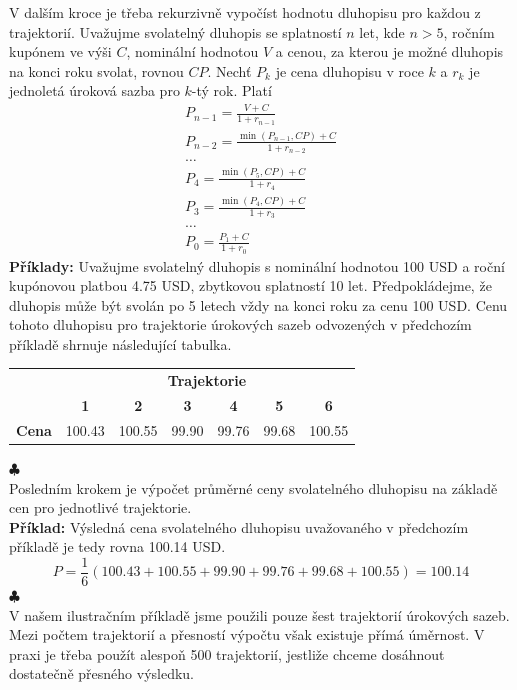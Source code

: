 \documentclass[a4paper]{book}
\begin{document}
V dalším kroce je třeba rekurzivně vypočíst hodnotu dluhopisu pro každou z trajektorií. Uvažujme svolatelný dluhopis se splatností $n$ let, kde $n > 5$, ročním kupónem ve výši $C$, nominální hodnotou $V$ a cenou, za kterou je možné dluhopis na konci roku svolat, rovnou $CP$. Nechť $P_k$ je cena dluhopisu v roce $k$ a $r_k$ je jednoletá úroková sazba pro $k$-tý rok. Platí
\begin{gather*}
P_{n-1} = \frac{V + C}{1 + r_{n-1}} \\
P_{n-2} = \frac{\min(P_{n-1},CP) + C}{1 + r_{n-2}} \\
\dots \\
P_4 = \frac{\min(P_5,CP) + C}{1 + r_4} \\
P_3 = \frac{\min(P_4,CP) + C}{1 + r_3} \\
\dots \\
P_0 = \frac{P_1 + C}{1 + r_0}
\end{gather*}
\noindent \textbf{Příklady:} Uvažujme svolatelný dluhopis s nominální hodnotou 100 USD a roční kupónovou platbou 4.75 USD, zbytkovou splatností 10 let. Předpokládejme, že dluhopis může být svolán po 5 letech vždy na konci roku za cenu 100 USD. Cenu tohoto dluhopisu pro trajektorie úrokových sazeb odvozených v předchozím příkladě shrnuje následující tabulka.
\begin{center}
\begin{tabular}{c c c c c c c}
 & \multicolumn{6}{c}{\textbf{Trajektorie}} \\
 & \textbf{1} & \textbf{2} & \textbf{3} & \textbf{4} & \textbf{5} & \textbf{6} \\
\hline
\textbf{Cena}  & 100.43 & 100.55 & 99.90 & 99.76 & 99.68 & 100.55
\end{tabular}
\end{center}
$\clubsuit$\\

Posledním krokem je výpočet průměrné ceny svolatelného dluhopisu na základě cen pro jednotlivé trajektorie.\\

\noindent \textbf{Příklad:} Výsledná cena svolatelného dluhopisu uvažovaného v předchozím příkladě je tedy rovna 100.14 USD.
\begin{equation*}
P = \frac{1}{6}(100.43 + 100.55 + 99.90 + 99.76 + 99.68 + 100.55) = 100.14
\end{equation*}
$\clubsuit$\\

V našem ilustračním příkladě jsme použili pouze šest trajektorií úrokových sazeb. Mezi počtem trajektorií a přesností výpočtu však existuje přímá úměrnost. V praxi je třeba použít alespoň 500 trajektorií, jestliže chceme dosáhnout dostatečně přesného výsledku.
\end{document}
